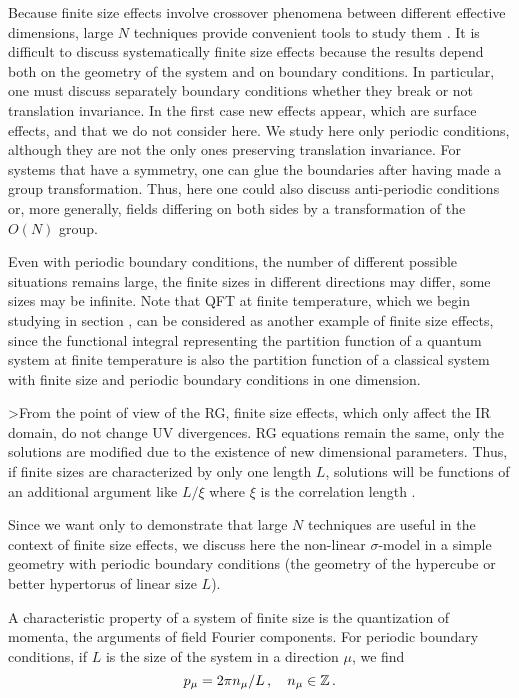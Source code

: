 Because finite size effects involve crossover phenomena between different effective dimensions, large $N$ techniques provide convenient tools to study them \rBrCaPe. It is difficult to discuss systematically finite size
effects because the results depend both on the geometry of the system and on
 boundary conditions. In particular, one must discuss separately boundary
conditions whether they break or not translation invariance. In
the first case new effects appear, which are surface effects, and that we do
not consider here.
We study here only periodic conditions, although they are not the only ones  preserving translation invariance. For systems that have a symmetry, one can
glue the boundaries after having made a group transformation. Thus,
here one could
also discuss anti-periodic conditions or, more generally, fields differing on both sides by a
transformation of the $O(N)$ group.\sslbl\ssNFSS \par
Even with periodic boundary conditions, the number of different possible situations remains large, the finite sizes in different directions may differ,
some sizes may be infinite. Note  that
QFT at finite temperature, which we begin studying in section \scFTQFT, can
be considered as another example of finite size effects, since the
functional integral representing the partition function of a quantum
system at finite temperature is also the partition function of a
classical system with finite size  and periodic
boundary conditions in one dimension.
\par
>From the point of view of the RG, finite size effects, which
only affect the IR domain, do not change UV divergences. RG
equations remain the same, only the solutions are modified due to
the existence of new dimensional parameters. Thus, if finite sizes
are characterized by only one length $L$, solutions will be
functions of an additional  argument like $L/\xi$ where $\xi$ is
the correlation length \rBZJFSS. \par Since we want only to
demonstrate that large $N$ techniques are useful in the context of
finite size effects, we discuss here the non-linear $\sigma
$-model in a simple geometry with periodic boundary conditions
(the geometry of the hypercube  or better hypertorus of linear
size $L$).\par A characteristic property of a system of finite
size is the quantization of momenta, the arguments of field
Fourier components. For periodic boundary conditions, if  $L$ is
the size of the system in a direction $\mu$, we find
$$p_\mu=2\pi n_\mu /L \,,\quad n_\mu\in {\Bbb Z}\,.$$
